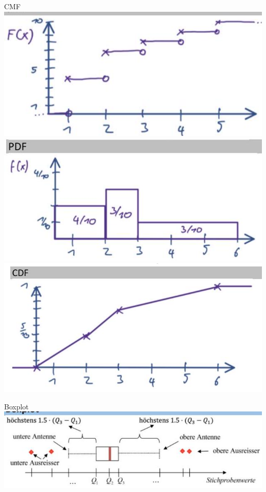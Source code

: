 \documentclass[10pt]{article}
\begin{document}
CMF\\
\includegraphics[width=\linewidth]{images/2024_12_29_0906b02acf849bda8665g-1(4)}\\
\includegraphics[width=\linewidth]{images/2024_12_29_0906b02acf849bda8665g-1(3)}\\
\includegraphics[width=\linewidth]{images/2024_12_29_0906b02acf849bda8665g-1}

Boxplot\\
\includegraphics[width=\linewidth]{images/2024_12_29_0906b02acf849bda8665g-1(5)}
\end{document}
